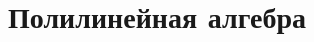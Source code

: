 \documentclass{scrartcl}
\begin{document}
    
    \setcounter{section}{27}
    
    
    \setcounter{section}{0}
        
    \part{Полилинейная алгебра}
\end{document}
